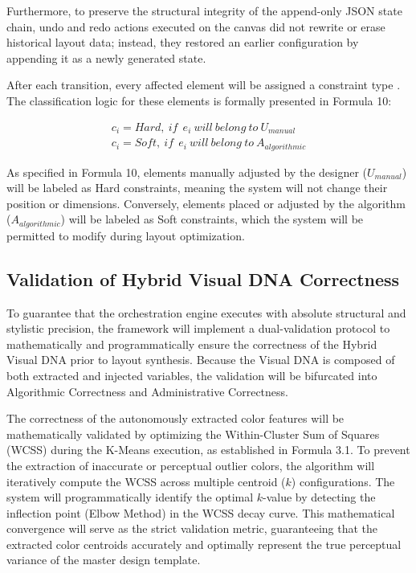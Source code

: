 \begin{refsection}
Furthermore, to preserve the structural integrity of the append-only JSON state chain, undo and redo actions executed on the canvas did not rewrite or erase historical layout data; instead, they restored an earlier configuration by appending it as a newly generated state.   

After each transition, every affected element will be assigned a constraint type \cite{Liu2026Multimedia}. The classification logic for these elements is formally presented in Formula 10:

\begin{center}
\begin{minipage}{0.8\textwidth}
\begin{equation}
\begin{aligned}
c_i=Hard,\ if\ \ e_i\ will\ belong\ to\ U_{manual} \\
c_i=Soft,\ if\ \ e_i\ will\ belong\ to\ A_{algorithmic}
\end{aligned}
\end{equation}
\centering
\end{minipage}
\end{center}

As specified in Formula 10, elements manually adjusted by the designer ($U_{manual}$) will be labeled as Hard constraints, meaning the system will not change their position or dimensions. Conversely, elements placed or adjusted by the algorithm ($A_{algorithmic}$) will be labeled as Soft constraints, which the system will be permitted to modify during layout optimization. 

\subsection{Validation of Hybrid Visual DNA Correctness}
To guarantee that the orchestration engine executes with absolute structural and stylistic precision, the framework will implement a dual-validation protocol to mathematically and programmatically ensure the correctness of the Hybrid Visual DNA prior to layout synthesis. Because the Visual DNA is composed of both extracted and injected variables, the validation will be bifurcated into Algorithmic Correctness and Administrative Correctness.

The correctness of the autonomously extracted color features will be mathematically validated by optimizing the Within-Cluster Sum of Squares (WCSS) during the K-Means execution, as established in Formula 3.1. To prevent the extraction of inaccurate or perceptual outlier colors, the algorithm will iteratively compute the WCSS across multiple centroid ($k$) configurations. The system will programmatically identify the optimal $k$-value by detecting the inflection point (Elbow Method) in the WCSS decay curve. This mathematical convergence will serve as the strict validation metric, guaranteeing that the extracted color centroids accurately and optimally represent the true perceptual variance of the master design template.


\end{refsection}
